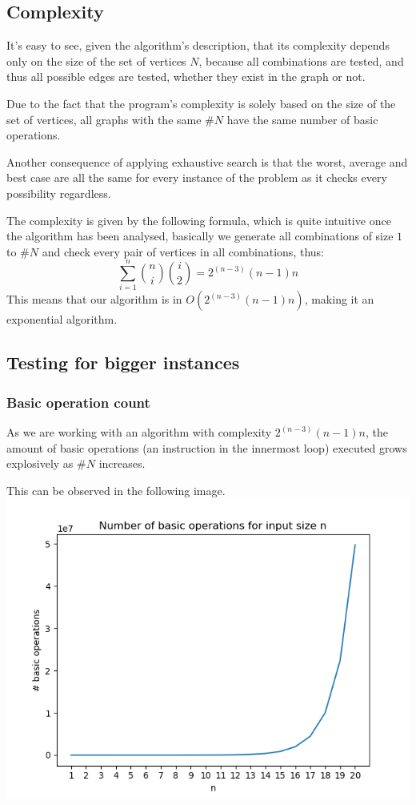 \documentclass[...]{revdetua}
\begin{document}
\subsection{Complexity}
It's easy to see, given the algorithm's description, that its complexity depends only on the size of the set of vertices $N$, because all combinations are tested, and thus all possible edges are tested, whether they exist in the graph or not.\par
Due to the fact that the program's complexity is solely based on the size of the set of vertices, all graphs with the same $\#N$ have the same number of basic operations.\par
Another consequence of applying exhaustive search is that the worst, average and best case are all the same for every instance of the problem as it checks every possibility regardless. \par
The complexity is given by the following formula, which is quite intuitive once the algorithm has been analysed, basically we generate all combinations of size $1$ to $\#N$ and check every pair of vertices in all combinations, thus: 
$$\sum_{i=1}^{n}{{n}\choose{i}}{{i}\choose{2}}=2^{(n-3)}(n-1)n$$
This means that our algorithm is in $O(2^{(n-3)}(n-1)n)$, making it an exponential algorithm. 
\subsection{Testing for bigger instances}
\subsubsection{Basic operation count}
As we are working with an algorithm with complexity $2^{(n-3)}(n-1)n$, the amount of basic operations (an instruction in the innermost loop) executed grows explosively as $\#N$ increases.\par This can be observed in the following image.
\includegraphics[scale=0.5]{basic_ops.png}
\end{document}
